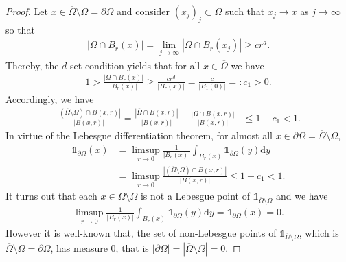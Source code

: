 \documentclass[12pt, reqno]{amsart}%
\theoremstyle{plain}  %
\theoremstyle{definition}  %
\numberwithin{equation}{section}
\renewcommand{\d}{\mathrm{d}}
\begin{document}
\begin{proof}
Let $x\in \overline{\Omega}\setminus \Omega =\partial \Omega$ and  consider $(x_j)_j\subset \Omega$ such that  $x_j\to x$ as $j\to \infty$ so that
\begin{align*}
|\Omega \cap B_r(x)|=\lim_{j\to \infty}|\Omega \cap B_r(x_j)| \geq cr^d.
\end{align*}
Thereby, the $d$-set condition yields that for all $x\in \overline{\Omega}$ we have
\begin{align*}
1> \frac{|\Omega \cap B_r(x)|}{|B_r(x)|}\geq   \frac{cr^d}{|B_r(x)|}=\frac{c}{|B_1(0)|}=: c_1>0.
\end{align*}
Accordingly,  we have
\begin{align*}
\frac{|(\overline{\Omega} \setminus\Omega)\cap B(x, r)|}{|B(x, r)|}
= \frac{|\overline{\Omega} \cap B(x, r)|}{|B(x, r)|}  -\frac{|\Omega\cap B(x, r)|}{|B(x, r)|}
&\leq 1 -c_1 < 1.
\end{align*}
In virtue of the Lebesgue differentiation theorem, for almost all  $x\in \partial\Omega= \overline{\Omega}\setminus \Omega $,
\begin{align*}
\mathds{1}_{\partial\Omega}(x)&= \limsup_{r \to 0}\frac{1}{|B_r(x)|}\int_{B_r(x)} \mathds{1}_{\partial\Omega}(y)\d y\\
&= \limsup_{r \to 0} \frac{|(\overline{\Omega} \setminus\Omega)\cap B(x, r)|}{|B(x, r)|}   \leq 1 - c_1 < 1.
\end{align*}
It turns out that each $x\in \overline{\Omega}\setminus \Omega $ is not a Lebesgue point of
$\mathds{1}_{\overline{\Omega}\setminus \Omega}$ and we have
\begin{align*}
\limsup_{r \to 0}\frac{1}{|B_r(x)|}\int_{B_r(x)} \mathds{1}_{\partial\Omega}(y)\d y=	\mathds{1}_{\partial\Omega}(x)=0 .
\end{align*}
However it is well-known that, the set of non-Lebesgue points of $\mathds{1}_{\overline{\Omega}\setminus \Omega}$, which is $ \overline{\Omega} \setminus\Omega=\partial\Omega$, has measure 0, that is $|\partial \Omega|= |\overline{\Omega}\setminus\Omega|=0$.
\end{proof}
\end{document}

